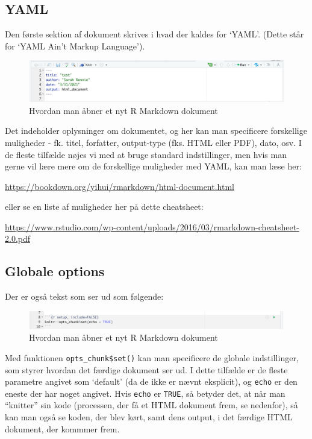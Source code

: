 \documentclass[
]{book}
\begin{document}
\hypertarget{yaml}{%
\subsection{YAML}\label{yaml}}

Den første sektion af dokument skrives i hvad der kaldes for `YAML'. (Dette står for `YAML Ain't Markup Language').

\begin{figure}
\centering
\includegraphics{plots/YAML.png}
\caption{Hvordan man åbner et nyt R Markdown dokument}
\end{figure}

Det indeholder oplysninger om dokumentet, og her kan man specificere forskellige muligheder - fk. titel, forfatter, output-type (fks. HTML eller PDF), dato, osv. I de fleste tilfælde nøjes vi med at bruge standard indstillinger, men hvis man gerne vil lære mere om de forskellige muligheder med YAML, kan man læse her:

\url{https://bookdown.org/yihui/rmarkdown/html-document.html}

eller se en liste af muligheder her på dette cheatsheet:

\url{https://www.rstudio.com/wp-content/uploads/2016/03/rmarkdown-cheatsheet-2.0.pdf}

\hypertarget{globale-options}{%
\subsection{Globale options}\label{globale-options}}

Der er også tekst som ser ud som følgende:

\begin{figure}
\centering
\includegraphics{plots/global_options.png}
\caption{Hvordan man åbner et nyt R Markdown dokument}
\end{figure}

Med funktionen \texttt{opts\_chunk\$set()} kan man specificere de globale indstillinger, som styrer hvordan det færdige dokument ser ud. I dette tilfælde er de fleste parametre angivet som `default' (da de ikke er nævnt eksplicit), og \texttt{echo} er den eneste der har noget angivet. Hvis \texttt{echo} er \texttt{TRUE}, så betyder det, at når man ``knitter'' sin kode (processen, der få et HTML dokument frem, se nedenfor), så kan man også se koden, der blev kørt, samt dens output, i det færdige HTML dokument, der kommmer frem.
\end{document}
